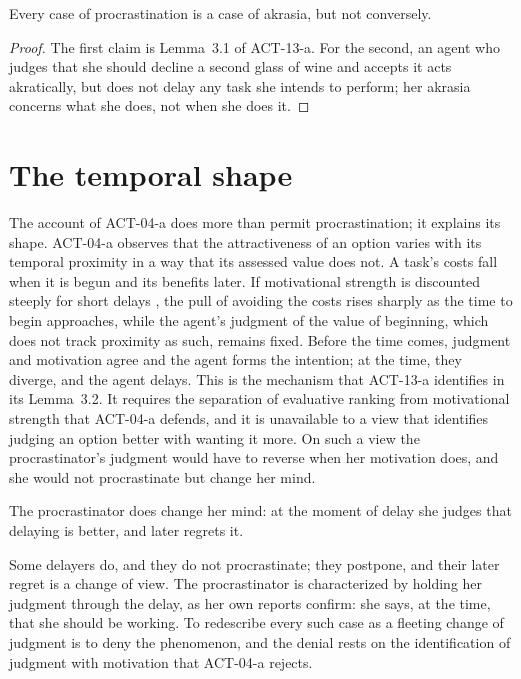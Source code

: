 \documentclass{situationist-preprint}
\begin{document}
\begin{proposition}\label{p:species}
Every case of procrastination is a case of akrasia, but not conversely.
\end{proposition}

\begin{proof}
The first claim is Lemma~3.1 of ACT-13-a. For the second, an agent who judges that she should decline a second glass of wine and accepts it acts akratically, but does not delay any task she intends to perform; her akrasia concerns what she does, not when she does it.
\end{proof}

\section{The temporal shape}

The account of ACT-04-a does more than permit procrastination; it explains its shape. ACT-04-a observes that the attractiveness of an option varies with its temporal proximity in a way that its assessed value does not. A task's costs fall when it is begun and its benefits later. If motivational strength is discounted steeply for short delays \citep{Ainslie1992}, the pull of avoiding the costs rises sharply as the time to begin approaches, while the agent's judgment of the value of beginning, which does not track proximity as such, remains fixed. Before the time comes, judgment and motivation agree and the agent forms the intention; at the time, they diverge, and the agent delays. This is the mechanism that ACT-13-a identifies in its Lemma~3.2. It requires the separation of evaluative ranking from motivational strength that ACT-04-a defends, and it is unavailable to a view that identifies judging an option better with wanting it more. On such a view the procrastinator's judgment would have to reverse when her motivation does, and she would not procrastinate but change her mind.

\begin{objection}
The procrastinator does change her mind: at the moment of delay she judges that delaying is better, and later regrets it.
\end{objection}

\begin{reply}
Some delayers do, and they do not procrastinate; they postpone, and their later regret is a change of view. The procrastinator is characterized by holding her judgment through the delay, as her own reports confirm: she says, at the time, that she should be working. To redescribe every such case as a fleeting change of judgment is to deny the phenomenon, and the denial rests on the identification of judgment with motivation that ACT-04-a rejects.
\end{reply}
\end{document}
